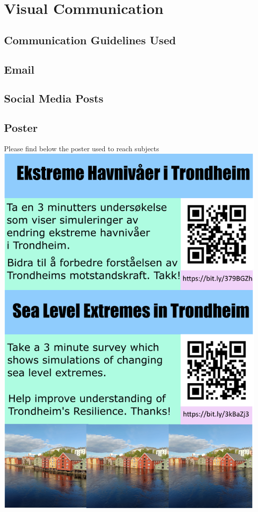\section{Visual Communication}
\subsection{Communication Guidelines Used}

\subsection{Email}

\subsection{Social Media Posts}

\subsection{Poster}

Please find below the poster used to reach subjects
\newpage
\includegraphics[width=1\textwidth]{fig_appendix/poster 4.0.png}